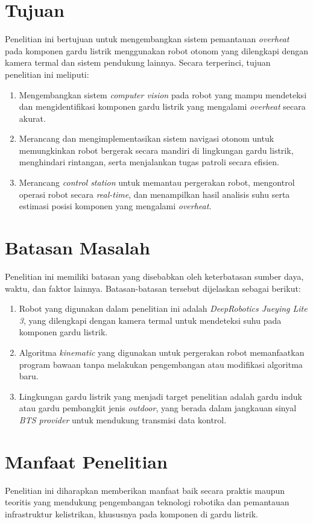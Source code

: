 \section{Tujuan}
Penelitian ini bertujuan untuk mengembangkan sistem pemantauan \emph{overheat} pada komponen gardu listrik menggunakan robot otonom yang dilengkapi dengan kamera termal dan sistem pendukung lainnya. Secara terperinci, tujuan penelitian ini meliputi:
\begin{enumerate}
    \item Mengembangkan sistem \emph{computer vision} pada robot yang mampu mendeteksi dan mengidentifikasi komponen gardu listrik yang mengalami \emph{overheat} secara akurat.
    \item Merancang dan mengimplementasikan sistem navigasi otonom untuk memungkinkan robot bergerak secara mandiri di lingkungan gardu listrik, menghindari rintangan, serta menjalankan tugas patroli secara efisien.
    \item Merancang \emph{control station} untuk memantau pergerakan robot, mengontrol operasi robot secara \emph{real-time}, dan menampilkan hasil analisis suhu serta estimasi posisi komponen yang mengalami \emph{overheat}.
\end{enumerate}

\section{Batasan Masalah}
Penelitian ini memiliki batasan yang disebabkan oleh keterbatasan sumber daya, waktu, dan faktor lainnya. Batasan-batasan tersebut dijelaskan sebagai berikut:
\begin{enumerate}
    \item Robot yang digunakan dalam penelitian ini adalah \emph{DeepRobotics Jueying Lite 3}, yang dilengkapi dengan kamera termal untuk mendeteksi suhu pada komponen gardu listrik.
    \item Algoritma \emph{kinematic} yang digunakan untuk pergerakan robot memanfaatkan program bawaan tanpa melakukan pengembangan atau modifikasi algoritma baru.
    \item Lingkungan gardu listrik yang menjadi target penelitian adalah gardu induk atau gardu pembangkit jenis \emph{outdoor}, yang berada dalam jangkauan sinyal \emph{BTS provider} untuk mendukung transmisi data kontrol.
\end{enumerate}
\section{Manfaat Penelitian}
Penelitian ini diharapkan memberikan manfaat baik secara praktis maupun teoritis yang mendukung pengembangan teknologi robotika dan pemantauan infrastruktur kelistrikan, khususnya pada komponen di gardu listrik.

